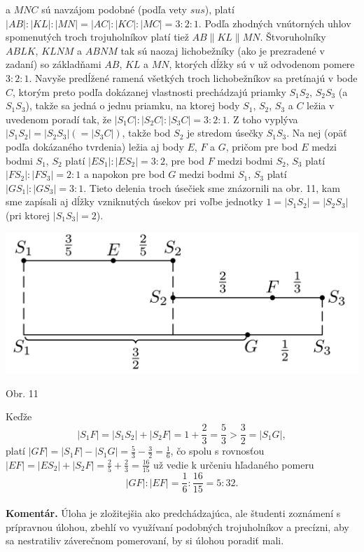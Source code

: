 \documentclass[11pt,a4paper,oneside,final]{book}
\newcommand{\kom}{\textbf{Komentár.} }
\begin{document}
a $MNC$ sú navzájom podobné (podľa vety $sus$), platí $|AB| : |KL| : |MN| = |AC| : |KC| : |MC| = 3 : 2 : 1$. Podľa zhodných vnútorných uhlov spomenutých troch trojuholníkov platí tiež $AB \parallel KL \parallel MN$. Štvoruholníky $ABLK$, $KLNM$ a $ABNM$ tak sú naozaj lichobežníky (ako je prezradené v zadaní) so základňami $AB$, $KL$ a $MN$, ktorých dĺžky sú v už odvodenom pomere $3 : 2 : 1$. Navyše predĺžené ramená všetkých troch lichobežníkov sa pretínajú v bode $C$, ktorým preto podľa dokázanej vlastnosti prechádzajú priamky $S_1 S_2$, $S_2 S_3$ (a $S_1 S_3$), takže sa jedná o jednu priamku, na ktorej body $S_1$, $S_2$, $S_3$ a $C$ ležia v uvedenom poradí tak, že $|S_1 C| : |S_2 C| : |S_3 C| = 3 : 2 : 1$. Z toho vyplýva $|S_1 S_2 | = |S_2 S_3 | (= |S_3 C|)$, takže bod $S_2$ je stredom úsečky $S_1 S_3$. Na nej (opäť podľa dokázaného tvrdenia) ležia aj body $E$, $F$ a $G$, pričom pre bod $E$ medzi bodmi $S_1$, $S_2$ platí $|ES_1 | : |ES_2 | = 3 : 2$, pre bod $F$ medzi bodmi $S_2$, $S_3$ platí $|FS_2| : |FS_3| = 2 : 1$ a napokon pre bod $G$ medzi bodmi $S_1$, $S_3$ platí $|GS_1| : |GS_3 | = 3 : 1$. Tieto delenia troch úsečiek sme znázornili na obr. 11, kam sme zapísali aj dĺžky vzniknutých úsekov pri voľbe jednotky $1 = |S_1 S_2 | = |S_2 S_3 |$ (pri ktorej $|S_1 S_3 | = 2$).
\begin{center}
\includegraphics[scale=0.3]{66D53}

Obr. 11
\end{center}
Keďže
$$|S_1 F| = |S_1 S_2 | + |S_2 F| = 1 +\frac{2}{3}=\frac{5}{3}>\frac{3}{2}= |S_1 G|,$$
platí $|GF| = |S_1 F| - |S_1 G| =\frac{5}{3} -\frac{3}{2}=\frac{1}{6}$, čo spolu s rovnosťou $|EF| = |ES_2 | + |S_2 F|=\frac{2}{5}+\frac{2}{3}=\frac{16}{15}$ už vedie k určeniu hľadaného pomeru
$$|GF| : |EF| =\frac{1}{6}:\frac{16}{15}= 5 : 32.$$
\\
\kom Úloha je zložitejšia ako predchádzajúca, ale študenti zoznámení s prípravnou úlohou, zbehlí vo využívaní podobných trojuholníkov a precízni, aby sa nestratiliv záverečnom pomerovaní, by si úlohou poradiť mali.
\end{document}
